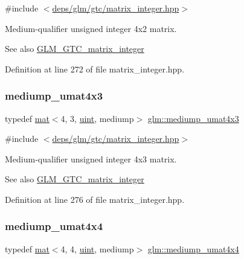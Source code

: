 {\ttfamily \#include $<$\hyperlink{matrix__integer_8hpp}{deps/glm/gtc/matrix\+\_\+integer.\+hpp}$>$}

Medium-\/qualifier unsigned integer 4x2 matrix. \begin{DoxySeeAlso}{See also}
\hyperlink{group__gtc__matrix__integer}{G\+L\+M\+\_\+\+G\+T\+C\+\_\+matrix\+\_\+integer} 
\end{DoxySeeAlso}


Definition at line 272 of file matrix\+\_\+integer.\+hpp.

\mbox{\label{group__gtc__matrix__integer_ga974bc32af0686378c4696208c3103d96}} 
\subsubsection{\texorpdfstring{mediump\+\_\+umat4x3}{mediump\_umat4x3}}
{\footnotesize\ttfamily typedef \hyperlink{structglm_1_1mat}{mat}$<$4, 3, \hyperlink{group__core__precision_ga4fd29415871152bfb5abd588334147c8}{uint}, mediump$>$ \hyperlink{group__gtc__matrix__integer_ga974bc32af0686378c4696208c3103d96}{glm\+::mediump\+\_\+umat4x3}}



{\ttfamily \#include $<$\hyperlink{matrix__integer_8hpp}{deps/glm/gtc/matrix\+\_\+integer.\+hpp}$>$}

Medium-\/qualifier unsigned integer 4x3 matrix. \begin{DoxySeeAlso}{See also}
\hyperlink{group__gtc__matrix__integer}{G\+L\+M\+\_\+\+G\+T\+C\+\_\+matrix\+\_\+integer} 
\end{DoxySeeAlso}


Definition at line 276 of file matrix\+\_\+integer.\+hpp.

\mbox{\label{group__gtc__matrix__integer_ga0dcca70aa643639489cf52acf7574e6c}} 
\subsubsection{\texorpdfstring{mediump\+\_\+umat4x4}{mediump\_umat4x4}}
{\footnotesize\ttfamily typedef \hyperlink{structglm_1_1mat}{mat}$<$4, 4, \hyperlink{group__core__precision_ga4fd29415871152bfb5abd588334147c8}{uint}, mediump$>$ \hyperlink{group__gtc__matrix__integer_ga0dcca70aa643639489cf52acf7574e6c}{glm\+::mediump\+\_\+umat4x4}}




